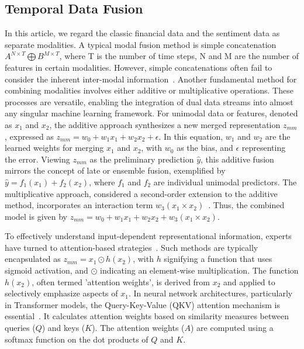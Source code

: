 \subsection{Temporal Data Fusion}
In this article, we regard the classic financial data and the sentiment data as separate modalities. A typical modal fusion method is simple concatenation~\cite{shahi2020stock,boukhers2022ensemble} $A^{N \times T} \bigoplus B^{M \times T}$, where T is the number of time steps, N and M are the number of features in certain modalities. However, simple concatenations often fail to consider the inherent inter-modal information~\cite{stahlschmidt2022multimodal}. Another fundamental method for combining modalities involves either additive or multiplicative operations. These processes are versatile, enabling the integration of dual data streams into almost any singular machine learning framework. For unimodal data or features, denoted as $x_1$ and $x_2$, the additive approach synthesizes a new merged representation $z_{mm}$, expressed as $z_{mm} = w_0 + w_1x_1 + w_2x_2 + \epsilon$. In this equation, $w_1$ and $w_2$ are the learned weights for merging $x_1$ and $x_2$, with $w_0$ as the bias, and $\epsilon$ representing the error. Viewing $z_{mm}$ as the preliminary prediction $\hat{y}$, this additive fusion mirrors the concept of late or ensemble fusion, exemplified by $\hat{y} = f_1(x_1) + f_2(x_2)$, where $f_1$ and $f_2$ are individual unimodal predictors. The multiplicative approach, considered a second-order extension to the additive method, incorporates an interaction term $w_3(x_1 \times x_2)$~\cite{liang2022foundations}. Thus, the combined model is given by $z_{mm} = w_0 + w_1x_1 + w_2x_2 + w_3(x_1 \times x_2)$.

To effectively understand input-dependent representational information, experts have turned to attention-based strategies~\cite{fu2021cross,zhou2021information,shih2019temporal}. Such methods are typically encapsulated as $z_{mm} = x_1 \odot h(x_2)$, with $h$ signifying a function that uses sigmoid activation, and $\odot$ indicating an element-wise multiplication. The function $h(x_2)$, often termed 'attention weights', is derived from $x_2$ and applied to selectively emphasize aspects of $x_1$. In neural network architectures, particularly in Transformer models, the Query-Key-Value (QKV) attention mechanism is essential~\cite{lim2021temporal,zhang2022temporal}. It calculates attention weights based on similarity measures between queries ($Q$) and keys ($K$). The attention weights ($A$) are computed using a softmax function on the dot products of $Q$ and $K$.

